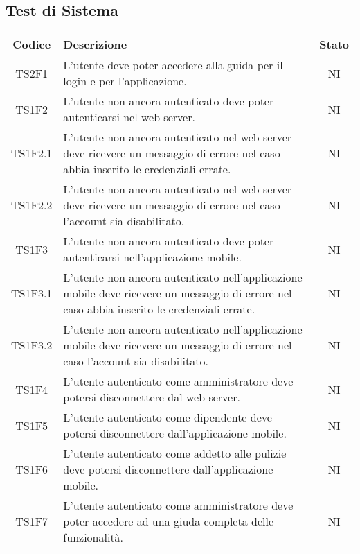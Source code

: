 	\subsection{Test di Sistema}
	\begin{center}
		\begin{longtable}{|c|p{10cm}|c|}
			\hline
			\rowcolor{lighter-grayer}
			\textbf{Codice} & \textbf{Descrizione} & \textbf{Stato}  \\ 
						
			\hline
			\endhead
			
			\hline
			TS2F1 & L'utente deve poter accedere alla guida per il login e per l'applicazione. & NI \\
			\hline
			TS1F2 & L'utente non ancora autenticato deve poter autenticarsi nel web server. & NI \\			
			\hline
			TS1F2.1 & L'utente non ancora autenticato nel web server deve ricevere un messaggio di errore nel caso abbia inserito le credenziali errate. & NI \\			
			\hline
			TS1F2.2 & L'utente non ancora autenticato nel web server deve ricevere un messaggio di errore nel caso l'account sia disabilitato. & NI \\			
			\hline
			TS1F3 & L'utente non ancora autenticato deve poter autenticarsi nell'applicazione mobile. & NI \\			
			\hline
			TS1F3.1 & L'utente non ancora autenticato nell'applicazione mobile deve ricevere un messaggio di errore nel caso abbia inserito le credenziali errate. & NI \\			
			\hline
			TS1F3.2 & L'utente non ancora autenticato nell'applicazione mobile deve ricevere un messaggio di errore nel caso l'account sia disabilitato. & NI \\			
			\hline
			TS1F4 & L'utente autenticato come amministratore deve potersi disconnettere dal web server. & NI \\			
			\hline
			TS1F5 & L'utente autenticato come dipendente deve potersi disconnettere dall'applicazione mobile. & NI \\			
			\hline			
			TS1F6 & L'utente autenticato come addetto alle pulizie deve potersi disconnettere dall'applicazione mobile. & NI \\			
			\hline
			TS1F7 & L'utente autenticato come amministratore deve poter accedere ad una giuda completa delle funzionalità. & NI \\		
			\hline

\end{longtable}
\end{center}

